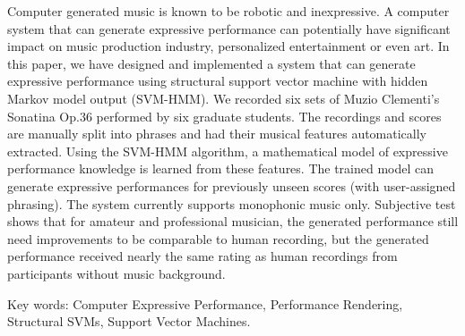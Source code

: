\begin{abstractEN}

Computer generated music is known to be robotic and inexpressive. A computer system that can generate expressive performance can potentially have significant impact on music production industry, personalized entertainment or even art. In this paper, we have designed and implemented a system that can generate expressive performance using structural support vector machine with hidden Markov model output (SVM-HMM). We recorded six sets of Muzio Clementi's Sonatina Op.36 performed by six graduate students. The recordings and scores are manually split into phrases and had their musical features automatically extracted. Using the SVM-HMM algorithm, a mathematical model of expressive performance knowledge is learned from these features. The trained model can generate expressive performances for previously unseen scores (with user-assigned phrasing). The system currently supports monophonic music only. Subjective test shows that for amateur and professional musician, the generated performance still need improvements to be comparable to human recording, but the generated performance received nearly the same rating as human recordings from participants without music background. 

Key words: Computer Expressive Performance, Performance Rendering, Structural SVMs, Support Vector Machines.
\end{abstractEN}
